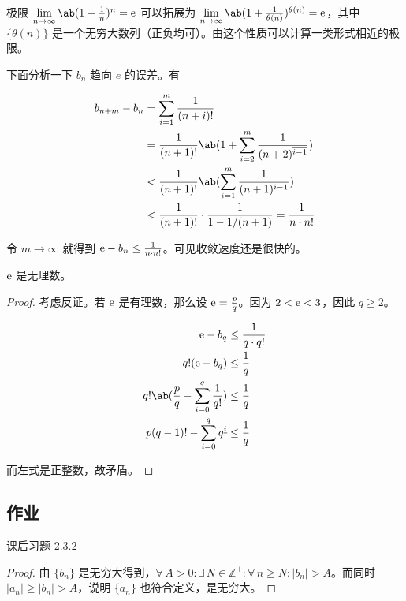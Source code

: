 极限 $\lim\limits_{n \to \infty} \ab(1 + \frac{1}{n})^n = \E$ 可以拓展为 $\lim\limits_{n \to \infty} \ab(1 + \frac{1}{\theta(n)})^{\theta(n)} = \E$，其中 $\{\theta(n)\}$ 是一个无穷大数列（正负均可）。由这个性质可以计算一类形式相近的极限。

下面分析一下 $b_n$ 趋向 $e$ 的误差。有

$$
\begin{aligned}
	b_{n+m} - b_n & = \sum_{i=1}^m \frac{1}{(n+i)!} \\
	& = \frac{1}{(n+1)!} \ab(1 + \sum_{i=2}^m \frac{1}{(n+2)^{\overline{i-1}}}) \\
	& < \frac{1}{(n+1)!} \ab(\sum_{i=1}^m \frac{1}{(n+1)^{i-1}}) \\
	& < \frac{1}{(n+1)!} \cdot \frac{1}{1 - 1/(n+1)} = \frac{1}{n \cdot n!} \\
\end{aligned}
$$

令 $m \to \infty$ 就得到 $\mathrm{e} - b_n \le \frac{1}{n \cdot n!}$。可见收敛速度还是很快的。

\begin{theorem}
	$\mathrm{e}$ 是无理数。

	\begin{proof}
		考虑反证。若 $\mathrm{e}$ 是有理数，那么设 $\mathrm{e} = \frac{p}{q}$。因为 $2 < \mathrm{e} < 3$，因此 $q \ge 2$。

		$$
		\begin{aligned}
			\E - b_q & \le \frac{1}{q \cdot q!} \\
			q!(\E - b_q) & \le \frac{1}{q} \\
			q!\ab(\frac{p}{q} - \sum_{i=0}^q \frac{1}{q!}) & \le \frac{1}{q} \\
			p(q-1)! - \sum_{i=0}^q q^{\underline{i}} & \le \frac{1}{q}
		\end{aligned}
		$$

		而左式是正整数，故矛盾。
	\end{proof}
\end{theorem}

\subsection{作业}

\begin{problem}
	课后习题 2.3.2

	\begin{proof}
		由 $\{b_n\}$ 是无穷大得到，$\forall\,A > 0: \exists\,N \in \mathbb{Z}^+: \forall\,n \ge N: |b_n| > A$。而同时 $|a_n| \ge |b_n| > A$，说明 $\{a_n\}$ 也符合定义，是无穷大。
	\end{proof}
\end{problem}

